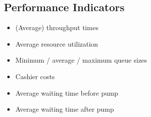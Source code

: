 \subsection{Performance Indicators}
\begin{itemize}
\item (Average) throughput times\\
\item Average resource utilization\\
\item Minimum / average / maximum queue sizes\\
\item Cashier costs\\
\item Average waiting time before pump\\
\item Average waiting time after pump
\end{itemize}